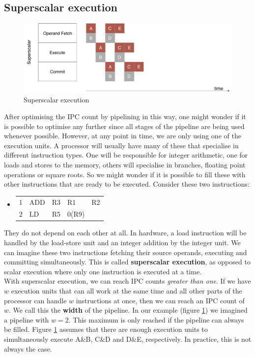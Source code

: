 \documentclass[12pt,a4paper]{article} %
\newenvironment {assembly}{\begingroup \ttfamily \color{Gray} \begin{itemize} \item[]}{\end{itemize}\endgroup}
\begin{document}
\subsection{Superscalar execution}
\begin{figure}[H]
	\centering
	\includegraphics[width=\textwidth]{Source/SchedulingSchemes/Superscalar.pdf}
	\caption{Superscalar execution} 
	\label{fig-superscalar}
\end{figure}
After optimising the IPC count by pipelining in this way, one might wonder if it is possible to optimise any further since all stages of the pipeline are being used whenever possible. However, at any point in time, we are only using one of the execution units. A processor will usually have many of these that specialise in different instruction types. One will be responsible for integer arithmetic, one for loads and stores to the memory, others will specialise in branches, floating point operations or square roots. So we might wonder if it is possible to fill these with other instructions that are ready to be executed. Consider these two instructions:
\begin{assembly}
	\begin{tabularx} {\textwidth} {n o a a X}
		1 & ADD & R3 & R1		& R2 \\
		2 & LD  & R5 & 0(R9)	& \\
	\end{tabularx}
\end{assembly}
They do not depend on each other at all. In hardware, a load instruction will be handled by the load-store unit and an integer addition by the integer unit. We can imagine these two instructions fetching their source operands, executing and committing simultaneously. This is called \textbf{superscalar execution}, as opposed to scalar execution where only one instruction is executed at a time.\\

With superscalar execution, we can reach IPC counts \textit{greater than one}. If we have $w$ execution units that can all work at the same time and all other parts of the processor can handle $w$ instructions at once, then we can reach an IPC count of $w$. We call this the \textbf{width} of the pipeline. In our example (figure \ref{fig-superscalar}) we imagined a pipeline with $w=2$. This maximum is only reached if the pipeline can always be filled. Figure \ref{fig-superscalar} assumes that there are enough execution units to simultaneously execute A\&B, C\&D and D\&E, respectively. In practice, this is not always the case.
\end{document}
